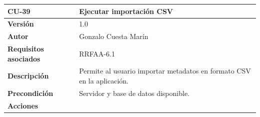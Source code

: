 \documentclass[
]{article}
\begin{document}
\begin{longtable}[]{@{}ll@{}}
\toprule
\begin{minipage}[b]{0.16\columnwidth}\raggedright
\textbf{CU-39}\strut
\end{minipage} & \begin{minipage}[b]{0.78\columnwidth}\raggedright
\textbf{Ejecutar importación CSV}\strut
\end{minipage}\tabularnewline
\midrule
\endhead
\begin{minipage}[t]{0.16\columnwidth}\raggedright
\textbf{Versión}\strut
\end{minipage} & \begin{minipage}[t]{0.78\columnwidth}\raggedright
1.0\strut
\end{minipage}\tabularnewline
\begin{minipage}[t]{0.16\columnwidth}\raggedright
\textbf{Autor}\strut
\end{minipage} & \begin{minipage}[t]{0.78\columnwidth}\raggedright
Gonzalo Cuesta Marín\strut
\end{minipage}\tabularnewline
\begin{minipage}[t]{0.16\columnwidth}\raggedright
\textbf{Requisitos asociados}\strut
\end{minipage} & \begin{minipage}[t]{0.78\columnwidth}\raggedright
RRFAA-6.1\strut
\end{minipage}\tabularnewline
\begin{minipage}[t]{0.16\columnwidth}\raggedright
\textbf{Descripción}\strut
\end{minipage} & \begin{minipage}[t]{0.78\columnwidth}\raggedright
Permite al usuario importar metadatos en formato CSV en la
aplicación.\strut
\end{minipage}\tabularnewline
\begin{minipage}[t]{0.16\columnwidth}\raggedright
\textbf{Precondición}\strut
\end{minipage} & \begin{minipage}[t]{0.78\columnwidth}\raggedright
Servidor y base de datos disponible.\strut
\end{minipage}\tabularnewline
\begin{minipage}[t]{0.16\columnwidth}\raggedright
\textbf{Acciones}\strut
\end{minipage} & \begin{minipage}[t]{0.78\columnwidth}\raggedright
\begin{enumerate}

\end{enumerate}
\end{minipage}
\end{longtable}
\end{document}
